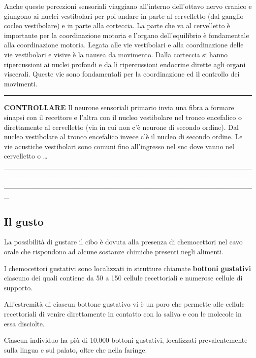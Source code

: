 \documentclass[]{article}
\begin{document}
Anche queste percezioni sensoriali viaggiano all'interno dell'ottavo
nervo cranico e giungono ai nuclei vestibolari per poi andare in parte
al cervelletto (dal ganglio cocleo vestibolare) e in parte alla
corteccia. La parte che va al cervelletto è importante per la
coordinazione motoria e l'organo dell'equilibrio è fondamentale alla
coordinazione motoria. Legata alle vie vestibolari e alla coordinazione
delle vie vestibolari e visive è la nausea da movimento. Dalla corteccia
si hanno ripercussioni ai nuclei profondi e da lì ripercussioni
endocrine dirette agli organi viscerali. Queste vie sono fondamentali
per la coordinazione ed il controllo dei movimenti.

\begin{center}\rule{0.5\linewidth}{\linethickness}\end{center}

\textbf{CONTROLLARE} Il neurone sensoriali primario invia una fibra a
formare sinapsi con il recettore e l'altra con il nucleo vestibolare nel
tronco encefalico o direttamente al cervelletto (via in cui non c'è
neurone di secondo ordine). Dal nucleo vestibolare al tronco encefalico
invece c'è il nucleo di secondo ordine. Le vie acustiche vestibolari
sono comuni fino all'ingresso nel snc dove vanno nel cervelletto o
\ldots{}
\_\_\_\_\_\_\_\_\_\_\_\_\_\_\_\_\_\_\_\_\_\_\_\_\_\_\_\_\_\_\_\_\_\_\_\_\_\_\_\_\_\_\_\_\_\_\_\_\_\_\_\_\_\_\_\_\_\_\_\_\_\_\_\_\_\_\_\_\_\_\_\_\_\_\_\_\_\_\_\_\_\_\_\_\_\_\_\_\_\_\_\_\_\_\_\_\_\_\_\_\_\_\_\_\_\_\_\_\_\_\_\_\_\_\_\_\_\_\_\_\_\_\_\_\_\_\_\_\_\_\_\_\_\_\_\_\_\_\_\_\_\_\_\_\_

\subsection{Il gusto}\label{il-gusto}

La possibilità di gustare il cibo è dovuta alla presenza di chemocettori
nel cavo orale che rispondono ad alcune sostanze chimiche presenti negli
alimenti.

I chemocettori gustativi sono localizzati in strutture chiamate
\textbf{bottoni gustativi} ciascuno dei quali contiene da 50 a 150
cellule recettoriali e numerose cellule di supporto.

All'estremità di ciascun bottone gustativo vi è un poro che permette
alle cellule recettoriali di venire direttamente in contatto con la
saliva e con le molecole in essa disciolte.

Ciascun individuo ha più di 10.000 bottoni gustativi, localizzati
prevalentemente sulla lingua e sul palato, oltre che nella faringe.
\end{document}
